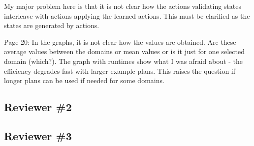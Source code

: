 \documentclass{article}
\begin{document}
\begin{mdframed}[hidealllines=true,backgroundcolor=gray!20]
  My major problem here is that it is not clear how the actions validating states interleave with actions applying the learned actions. This must be clarified as the states are generated by actions.
\end{mdframed}

\begin{mdframed}[hidealllines=true,backgroundcolor=gray!20]
  Page 20: In the graphs, it is not clear how the values are obtained. Are these average values between the domains or mean values or is it just for one selected domain (which?).
  The graph with runtimes show what I was afraid about - the efficiency degrades fast with larger example plans. This raises the question if longer plans can be used if needed for some domains.
\end{mdframed}



\subsection*{Reviewer \#2}

\begin{mdframed}[hidealllines=true,backgroundcolor=gray!20]
\end{mdframed}

\begin{mdframed}[hidealllines=true,backgroundcolor=gray!20]
\end{mdframed}

\begin{mdframed}[hidealllines=true,backgroundcolor=gray!20]
\end{mdframed}

\begin{mdframed}[hidealllines=true,backgroundcolor=gray!20]
\end{mdframed}

\begin{mdframed}[hidealllines=true,backgroundcolor=gray!20]
\end{mdframed}


\subsection*{Reviewer \#3}
\end{document}
